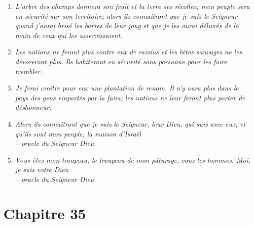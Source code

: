 \begin{enumerate}[leftmargin=\psleftmargin, labelsep = \pslabelsep, label={\arabic*}, font=\color{\pscolor}\small\textsuperscript, parsep=0em, itemsep=0em, topsep=0em ]
{          Je ferai tomber en son temps la pluie qui sera une pluie de bénédiction.}
  \item {}\textit{L’arbre des champs donnera son fruit \brk
          et la terre ses récoltes; \brk
          mon peuple sera en sécurité sur son territoire; \brk
          alors ils connaîtront que je suis le Seigneur \brk
          quand j’aurai brisé les barres de leur joug \brk
          et que je les aurai délivrés de la main de ceux qui les asservissaient.}
  \item {}\textit{Les nations ne feront plus contre eux de razzias \brk
          et les bêtes sauvages ne les dévoreront plus. \brk
          Ils habiteront en sécurité sans personne pour les faire trembler.}
  \item {}\textit{Je ferai croître pour eux une plantation de renom. \brk
          Il n’y aura plus dans le pays des gens emportés par la faim; \brk
          les nations ne leur feront plus porter de déshonneur.}\verseSpace
  \item {}\textit{Alors ils connaîtront que je suis le Seigneur, leur Dieu, qui suis avec eux, \brk
          et qu’ils sont mon peuple, la maison d’Israël \\
           – oracle du Seigneur Dieu.}
  \item {}\textit{Vous êtes mon troupeau, le troupeau de mon pâturage, vous les hommes. \brk
          Moi, je suis votre Dieu \\
          – oracle du Seigneur Dieu.}
\end{enumerate}
\newpage


\section*{Chapitre 35}
